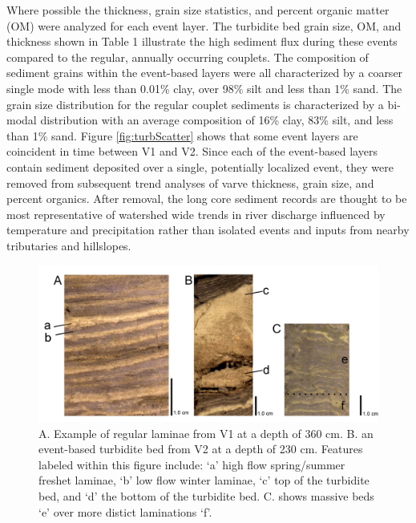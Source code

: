 \documentclass[Royal,times,doublespace,sageh]{sagej}
\begin{document}
Where possible the thickness, grain size statistics, and percent organic
matter (OM) were analyzed for each event layer. The turbidite bed grain
size, OM, and thickness shown in Table 1 illustrate the high sediment
flux during these events compared to the regular, annually occurring
couplets. The composition of sediment grains within the event-based
layers were all characterized by a coarser single mode with less than
0.01\% clay, over 98\% silt and less than 1\% sand. The grain size
distribution for the regular couplet sediments is characterized by a
bi-modal distribution with an average composition of 16\% clay, 83\%
silt, and less than 1\% sand. Figure \ref{fig:turbScatter} shows that
some event layers are coincident in time between V1 and V2. Since each
of the event-based layers contain sediment deposited over a single,
potentially localized event, they were removed from subsequent trend
analyses of varve thickness, grain size, and percent organics. After
removal, the long core sediment records are thought to be most
representative of watershed wide trends in river discharge influenced by
temperature and precipitation rather than isolated events and inputs
from nearby tributaries and hillslopes.

\begin{figure}

{\centering \includegraphics[width=1\linewidth]{../figs/long_core/good_vs_flood_vs_disturbed_varves_} 

}

\caption{A. Example of regular laminae from V1 at a depth of 360 cm. B. an event-based turbidite bed from V2 at a depth of 230 cm. Features labeled within this figure include: ‘a’ high flow spring/summer freshet laminae, ‘b’ low flow winter laminae, ‘c’  top of the turbidite bed, and ‘d’ the bottom of the turbidite bed. C. shows massive beds ‘e’ over more distict laminations ‘f’.\label{tab:varve-turb}}\label{fig:varve-turb}
\end{figure}
\end{document}
